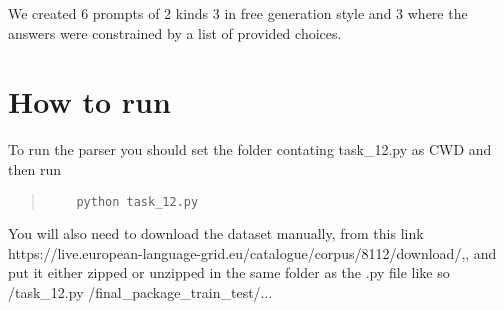\documentclass[11pt]{article}
\begin{document}
We created 6 prompts of 2 kinds 3 in free generation style and 3 where the answers were constrained by a list of provided 
choices.

\section{How to run}
To run the parser you should set the folder contating task\_12.py as CWD and then run
\begin{quote}
  \begin{verbatim}
    python task_12.py
  \end{verbatim}
\end{quote}
\noindent You will also need to download the dataset manually, 
from this link https://live.european-language-grid.eu/catalogue/corpus/8112/download/,, and put it either 
zipped or unzipped in the same folder as the .py file like so /task\_12.py /final\_package\_train\_test/...

\newpage
\end{document}
